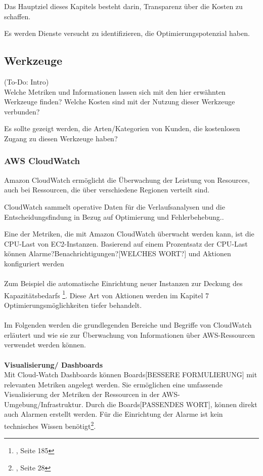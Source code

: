Das Hauptziel dieses Kapitels besteht darin, Transparenz über die Kosten zu schaffen.

Es werden Dienste versucht zu identifizieren, die Optimierungspotenzial haben. 
\\
\subsection{Werkzeuge}
(To-Do: Intro)\\

Welche Metriken und Informationen lassen sich mit den hier erwähnten Werkzeuge finden?
Welche Kosten sind mit der Nutzung dieser Werkzeuge verbunden?


Es sollte gezeigt werden, die Arten/Kategorien von Kunden, die kostenlosen Zugang zu diesen Werkzeuge haben?


\subsubsection{AWS CloudWatch}

Amazon CloudWatch ermöglicht die Überwachung der Leistung von Resources, auch bei Ressourcen, die über verschiedene Regionen verteilt sind. 

CloudWatch sammelt operative Daten für die Verlaufsanalysen und die Entscheidungsfindung in Bezug auf Optimierung und Fehlerbehebung..

Eine der Metriken, die mit Amazon CloudWatch überwacht werden kann, ist die CPU-Last von EC2-Instanzen. 
Basierend auf einem Prozentsatz der CPU-Last können Alarme?Benachrichtigungen?[WELCHES WORT?] und Aktionen konfiguriert werden
\\\\
Zum Beispiel die automatische Einrichtung neuer Instanzen zur Deckung des Kapazitätsbedarfs
\footnote{\cite{AWS1}, Seite 185}. 
Diese Art von Aktionen werden im Kapitel 7 Optimierungsmöglichkeiten tiefer behandelt.
\\\\
Im Folgenden werden die grundlegenden Bereiche und Begriffe von CloudWatch erläutert und wie sie zur Überwachung von Informationen über AWS-Ressourcen verwendet werden können.
\\\\
\textbf{Visualisierung/ Dashboards}\\
Mit Cloud-Watch Dashboards können Boards[BESSERE FORMULIERUNG] mit relevanten Metriken angelegt werden. Sie ermöglichen eine umfassende Visualisierung der Metriken der Ressourcen in der AWS-Umgebung/Infrastruktur. Durch die Boards[PASSENDES WORT], können direkt auch Alarmen erstellt werden. Für die Einrichtung der Alarme ist kein technisches Wissen benötigt\footnote{\cite{AMZ14}, Seite 28}.

